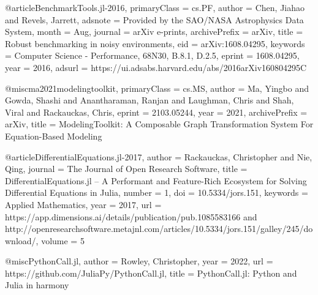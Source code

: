 @article{BenchmarkTools.jl-2016,
 primaryClass  = {cs.PF},
 author        = {{Chen}, Jiahao and {Revels}, Jarrett},
 adsnote       = {Provided by the SAO/NASA Astrophysics Data System},
 month         = {Aug},
 journal       = {arXiv e-prints},
 archivePrefix = {arXiv},
 title         = {{Robust benchmarking in noisy environments}},
 eid           = {arXiv:1608.04295},
 keywords      = {Computer Science - Performance, 68N30, B.8.1, D.2.5},
 eprint        = {1608.04295},
 year          = {2016},
 adsurl        = {https://ui.adsabs.harvard.edu/abs/2016arXiv160804295C}
}

@misc{ma2021modelingtoolkit,
 primaryClass  = {cs.MS},
 author        = {Ma, Yingbo and Gowda, Shashi and Anantharaman, Ranjan and Laughman, Chris and Shah, Viral and Rackauckas, Chris},
 eprint        = {2103.05244},
 year          = {2021},
 archivePrefix = {arXiv},
 title         = {ModelingToolkit: A Composable Graph Transformation System For Equation-Based Modeling}
}

@article{DifferentialEquations.jl-2017,
 author        = {Rackauckas, Christopher and Nie, Qing},
 journal       = {The Journal of Open Research Software},
 title         = {DifferentialEquations.jl – A Performant and Feature-Rich Ecosystem for Solving Differential Equations in Julia},
 number        = {1},
 doi           = {10.5334/jors.151},
 keywords      = {Applied Mathematics},
 year          = {2017},
 url           = {https://app.dimensions.ai/details/publication/pub.1085583166 and http://openresearchsoftware.metajnl.com/articles/10.5334/jors.151/galley/245/download/},
 volume        = {5}
}

@misc{PythonCall.jl,
 author        = {Rowley, Christopher},
 year          = {2022},
 url           = {https://github.com/JuliaPy/PythonCall.jl},
 title         = {PythonCall.jl: Python and Julia in harmony}
}

